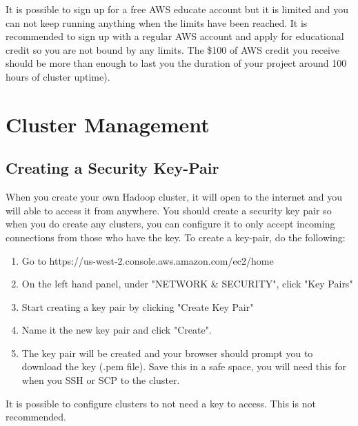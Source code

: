 \documentclass{article}
\begin{document}
\begin{info}
It is possible to sign up for a free AWS educate account but it is limited and you can not keep running anything when the limits have been reached. It is recommended to sign up with a regular AWS account and apply for educational credit so you are not bound by any limits. The \$100 of AWS credit you receive should be more than enough to last you the duration of your project around 100 hours of cluster uptime).
\end{info}


\section{Cluster Management}

\subsection{Creating a Security Key-Pair}
When you create your own Hadoop cluster, it will open to the internet and you will able to access it from anywhere. You should create a security key pair so when you do create any clusters, you can configure it to only accept incoming connections from those who have the key. To create a key-pair, do the following:

\begin{enumerate}
    \item Go to https://us-west-2.console.aws.amazon.com/ec2/home
    \item On the left hand panel, under "NETWORK \& SECURITY", click "Key Pairs"
    \item Start creating a key pair by clicking "Create Key Pair"
    \item Name it the new key pair and click "Create".
    \item The key pair will be created and your browser should prompt you to download the key (.pem file). Save this in a safe space, you will need this for when you SSH or SCP to the cluster. 
\end{enumerate}

\begin{info}
It is possible to configure clusters to not need a key to access. This is not recommended.
\end{info}
\end{document}
